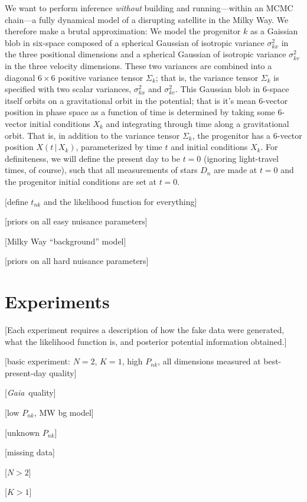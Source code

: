\documentclass[letterpaper,12pt,preprint]{aastex}
\newcommand{\project}[1]{\textsl{#1}}
\newcommand{\gaia}{\project{Gaia}}
\newcommand{\given}{\,|\,}
\begin{document}
We want to perform inference \emph{without} building and
running---within an MCMC chain---a fully dynamical model of a
disrupting satellite in the Milky Way.  We therefore make a brutal
approximation: We model the progenitor $k$ as a Gaissian blob in
six-space composed of a spherical Gaussian of isotropic variance
$\sigma_{kx}^2$ in the three positional dimensions and a spherical
Gaussian of isotropic variance $\sigma_{kv}^2$ in the three velocity
dimensions.  These two variances are combined into a diagonal $6\times
6$ positive variance tensor $\Sigma_k$; that is, the variance tensor
$\Sigma_k$ is specified with two scalar variances, $\sigma_{kx}^2$ and
$\sigma_{kv}^2$.  This Gaussian blob in 6-space itself orbits on a
gravitational orbit in the potential; that is it's mean 6-vector
position in phase space as a function of time is determined by taking
some 6-vector initial conditions $X_k$ and integrating through time
along a gravitational orbit.  That is, in addition to the variance
tensor $\Sigma_k$, the progenitor has a 6-vector position $X(t\given
X_k)$, parameterized by time $t$ and initial conditions $X_k$.  For
definiteness, we will define the present day to be $t=0$ (ignoring
light-travel times, of course), such that all measurements of stars
$D_n$ are made at $t=0$ and the progenitor initial conditions are set
at $t=0$.

[define $t_{nk}$ and the likelihood function for everything]

[priors on all easy nuisance parameters]

[Milky Way ``background'' model]

[priors on all hard nuisance parameters]

\section{Experiments}

[Each experiment requires a description of how the fake data were
  generated, what the likelihood function is, and posterior potential
  information obtained.]

[basic experiment: $N=2$, $K=1$, high $P_{nk}$, all dimensions
  measured at best-present-day quality]

[\gaia\ quality]

[low $P_{nk}$, MW bg model]

[unknown $P_{nk}$]

[missing data]

[$N>2$]

[$K>1$]
\end{document}
